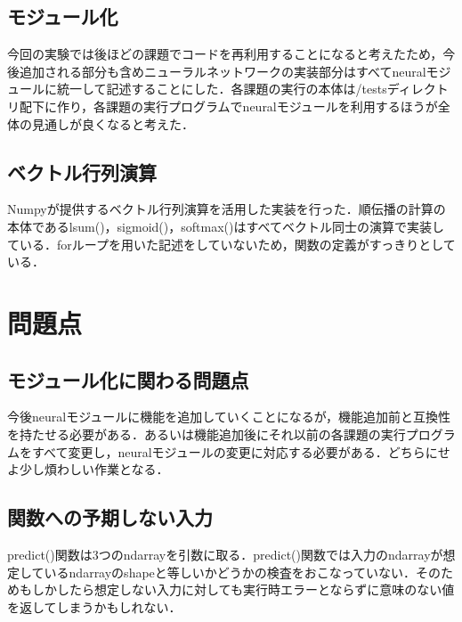 \documentclass[uplatex]{jsarticle}
\begin{document}
    \subsection{モジュール化}
    今回の実験では後ほどの課題でコードを再利用することになると考えたため，今後追加される部分も含めニューラルネットワークの実装部分はすべてneuralモジュールに統一して記述することにした．各課題の実行の本体は/testsディレクトリ配下に作り，各課題の実行プログラムでneuralモジュールを利用するほうが全体の見通しが良くなると考えた．

    \subsection{ベクトル行列演算}
    Numpyが提供するベクトル行列演算を活用した実装を行った．順伝播の計算の本体であるlsum()，sigmoid()，softmax()はすべてベクトル同士の演算で実装している．forループを用いた記述をしていないため，関数の定義がすっきりとしている．

    \section{問題点}

    \subsection{モジュール化に関わる問題点}
    今後neuralモジュールに機能を追加していくことになるが，機能追加前と互換性を持たせる必要がある．あるいは機能追加後にそれ以前の各課題の実行プログラムをすべて変更し，neuralモジュールの変更に対応する必要がある．どちらにせよ少し煩わしい作業となる．

    \subsection{関数への予期しない入力}
    predict()関数は3つのndarrayを引数に取る．predict()関数では入力のndarrayが想定しているndarrayのshapeと等しいかどうかの検査をおこなっていない．そのためもしかしたら想定しない入力に対しても実行時エラーとならずに意味のない値を返してしまうかもしれない．
\end{document}
